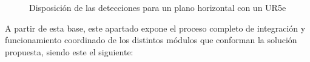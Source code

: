   \begin{figure}[H]
      \begin{center}
        \subcapcentertrue
        \hspace{1mm}
      \end{center}
      \caption{Disposición de las detecciones para un plano horizontal con un UR5e}
      \label{fig:UR5e_planopared}
   \end{figure}

A partir de esta base, este apartado expone el proceso completo de integración y funcionamiento coordinado de los distintos módulos que conforman la solución propuesta, siendo este el siguiente:

